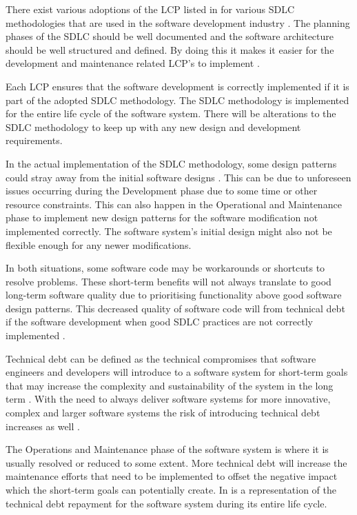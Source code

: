 There exist various adoptions of the LCP listed in  for various SDLC methodologies that are used in the software development industry \cite{Al-Saiyd2015, Jain2018}. The planning phases of the SDLC should be well documented and the software architecture should be well structured and defined. By doing this it makes it easier for the development and maintenance related LCP's to implement \cite{Ackermann2009}.\par Each LCP ensures that the software development is correctly implemented if it is part of the adopted SDLC methodology. The SDLC methodology is implemented for the entire life cycle of the software system. There will be alterations to the SDLC methodology to keep up with any new design and development requirements.\par In the actual implementation of the SDLC methodology, some design patterns could stray away from the initial software designs \cite{Reimanis2016}. This can be due to unforeseen issues occurring during the Development phase due to some time or other resource constraints. This can also happen in the Operational and Maintenance phase to implement new design patterns for the software modification not implemented correctly. The software system's initial design might also not be flexible enough for any newer modifications. \par In both situations, some software code may be workarounds or shortcuts to resolve problems. These short-term benefits will not always translate to good long-term software quality due to prioritising functionality above good software design patterns. This decreased quality of software code will from technical debt if the software development when good SDLC practices are not correctly implemented \cite{DeLeon-Sigg2020, Reimanis2016}.\par Technical debt can be defined as the technical compromises that software engineers and developers will introduce to a software system for short-term goals that may increase the complexity and sustainability of the system in the long term \cite{Snipes2018, Gralha2018}. With the need to always deliver software systems for more innovative, complex and larger software systems the risk of introducing technical debt increases as well \cite{Reimanis2016, Khan2013}. \par The Operations and Maintenance phase of the software system is where it is usually resolved or reduced to some extent. More technical debt will increase the maintenance efforts that need to be implemented to offset the negative impact which the short-term goals can potentially create. In  is a representation of the technical debt repayment for the software system during its entire life cycle.

